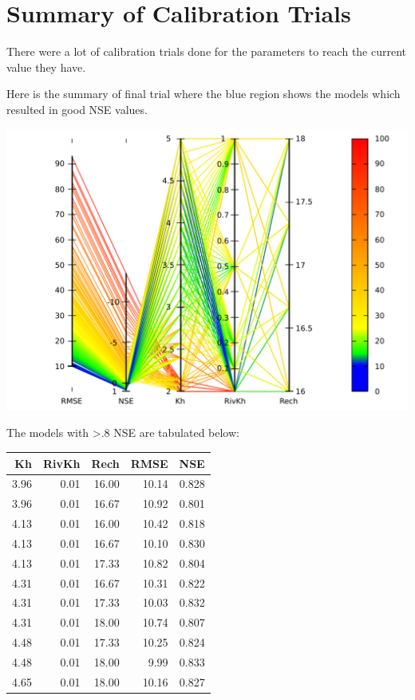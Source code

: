 \documentclass[titlepage,12pt]{unisubmission}
\begin{document}
\section{Summary of Calibration Trials}
\label{sec:org5fdd8bd}

There were a lot of calibration trials done for the parameters to reach the current value they have.

Here is the summary of final trial where the blue region shows the models which resulted in good NSE values.

\begin{center}
\includegraphics[width=.9\linewidth]{./images/4_calib-pp.pdf}
\end{center}

The models with >.8 NSE are tabulated below:

\begin{center}
\begin{tabular}{rrrrr}
\toprule
Kh & RivKh & Rech & RMSE & NSE\\
\midrule
3.96 & 0.01 & 16.00 & 10.14 & 0.828\\
3.96 & 0.01 & 16.67 & 10.92 & 0.801\\
4.13 & 0.01 & 16.00 & 10.42 & 0.818\\
4.13 & 0.01 & 16.67 & 10.10 & 0.830\\
4.13 & 0.01 & 17.33 & 10.82 & 0.804\\
4.31 & 0.01 & 16.67 & 10.31 & 0.822\\
4.31 & 0.01 & 17.33 & 10.03 & 0.832\\
4.31 & 0.01 & 18.00 & 10.74 & 0.807\\
4.48 & 0.01 & 17.33 & 10.25 & 0.824\\
4.48 & 0.01 & 18.00 & 9.99 & 0.833\\
4.65 & 0.01 & 18.00 & 10.16 & 0.827\\
\bottomrule
\end{tabular}
\end{center}
\end{document}
